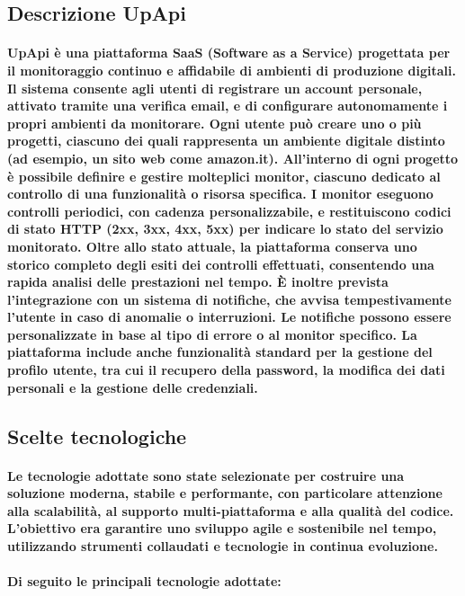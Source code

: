 \subsection{Descrizione UpApi}

\paragraph{UpApi è una piattaforma SaaS (Software as a Service) progettata per il monitoraggio continuo 
e affidabile di ambienti di produzione digitali. 
Il sistema consente agli utenti di registrare un account personale, attivato tramite una verifica email, 
e di configurare autonomamente i propri ambienti da monitorare.
Ogni utente può creare uno o più progetti, 
ciascuno dei quali rappresenta un ambiente digitale distinto (ad esempio, un sito web come amazon.it). 
All'interno di ogni progetto è possibile definire e gestire molteplici monitor, 
ciascuno dedicato al controllo di una funzionalità o risorsa specifica.
I monitor eseguono controlli periodici, con cadenza personalizzabile, 
e restituiscono codici di stato HTTP (2xx, 3xx, 4xx, 5xx) per indicare lo stato del servizio monitorato. 
Oltre allo stato attuale, la piattaforma conserva uno storico completo degli esiti dei controlli effettuati, 
consentendo una rapida analisi delle prestazioni nel tempo.
È inoltre prevista l’integrazione con un sistema di notifiche, 
che avvisa tempestivamente l’utente in caso di anomalie o interruzioni. 
Le notifiche possono essere personalizzate in base al tipo di errore o al monitor specifico.
La piattaforma include anche funzionalità standard per la gestione del profilo utente, 
tra cui il recupero della password, la modifica dei dati personali e la gestione delle credenziali.
}

\subsection{Scelte tecnologiche}

\paragraph{Le tecnologie adottate sono state selezionate per costruire una soluzione moderna, stabile e performante, 
con particolare attenzione alla scalabilità, al supporto multi-piattaforma e alla qualità del codice.
\\L’obiettivo era garantire uno sviluppo agile e sostenibile nel tempo, utilizzando strumenti collaudati e tecnologie in continua evoluzione.
\\\\Di seguito le principali tecnologie adottate:}

